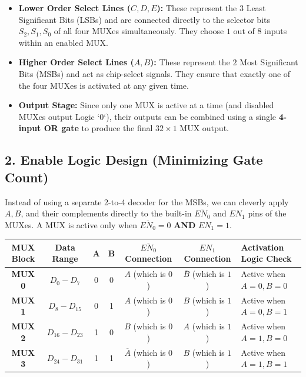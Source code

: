 \documentclass[12pt,a3paper]{article}
\begin{document}
\begin{enumerate}
\begin{tcolorbox}[enhanced,breakable,ansbox,colback=cD!4,colframe=cD,boxrule=0.8pt,arc=5pt,title={\textbf{Answer}},fonttitle=\bfseries\color{white},colbacktitle=cD]
\begin{itemize}
    \item \textbf{Lower Order Select Lines ($C, D, E$):} These represent the $3$ Least Significant Bits (LSBs) and are connected directly to the selector bits $S_2, S_1, S_0$ of all four MUXes simultaneously. They choose $1$ out of $8$ inputs within an enabled MUX.
    \item \textbf{Higher Order Select Lines ($A, B$):} These represent the $2$ Most Significant Bits (MSBs) and act as chip-select signals. They ensure that exactly one of the four MUXes is activated at any given time.
    \item \textbf{Output Stage:} Since only one MUX is active at a time (and disabled MUXes output Logic `0`), their outputs can be combined using a single \textbf{4-input OR gate} to produce the final $32 \times 1$ MUX output.
\end{itemize}

\vspace{0.2cm}
\subsection*{2. Enable Logic Design (Minimizing Gate Count)}
Instead of using a separate 2-to-4 decoder for the MSBs, we can cleverly apply $A, B$, and their complements directly to the built-in $\overline{EN_0}$ and $EN_1$ pins of the MUXes. A MUX is active only when $\overline{EN_0} = 0$ \textbf{AND} $EN_1 = 1$.

\begin{center}
\renewcommand{\arraystretch}{1.3}
\begin{tabular}{c | c | c c | c c | l}
\toprule
\textbf{MUX Block} & \textbf{Data Range} & $\mathbf{A}$ & $\mathbf{B}$ & \textbf{$\overline{EN_0}$ Connection} & \textbf{$EN_1$ Connection} & \textbf{Activation Logic Check} \\
\midrule
\textbf{MUX 0} & $D_0 - D_7$     & 0 & 0 & $A$ (which is $0$) & $\overline{B}$ (which is $1$) & Active when $A=0, B=0$ \\
\textbf{MUX 1} & $D_8 - D_{15}$  & 0 & 1 & $A$ (which is $0$) & $B$ (which is $1$)            & Active when $A=0, B=1$ \\
\textbf{MUX 2} & $D_{16} - D_{23}$ & 1 & 0 & $B$ (which is $0$) & $A$ (which is $1$)            & Active when $A=1, B=0$ \\
\textbf{MUX 3} & $D_{24} - D_{31}$ & 1 & 1 & $\overline{A}$ (which is $0$) & $B$ (which is $1$) & Active when $A=1, B=1$ \\
\bottomrule
\end{tabular}
\end{center}


\end{tcolorbox}
\end{enumerate}
\end{document}
